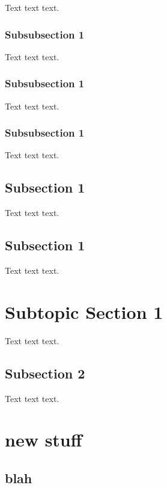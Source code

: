\documentclass[twoside]{amsart}
\theoremstyle{plain} %
\theoremstyle{definition}
\theoremstyle{remark}
\begin{document}
	Text text text.
	
	\subsubsection{Subsubsection 1}
	
	Text text text.
	
	\subsubsection{Subsubsection 1}
	
	Text text text.
	
	\subsubsection{Subsubsection 1}
	
	Text text text.
	
	\subsection{Subsection 1}
	
	Text text text.
	
	\subsection{Subsection 1}
	
	Text text text.
	
	\section{Subtopic Section 1}
	
	Text text text.
	
	\subsection{Subsection 2}
	
	Text text text.
	
	\clearpage 
	
	\section{new stuff}
	
	\subsection{blah}
	
\end{document}

